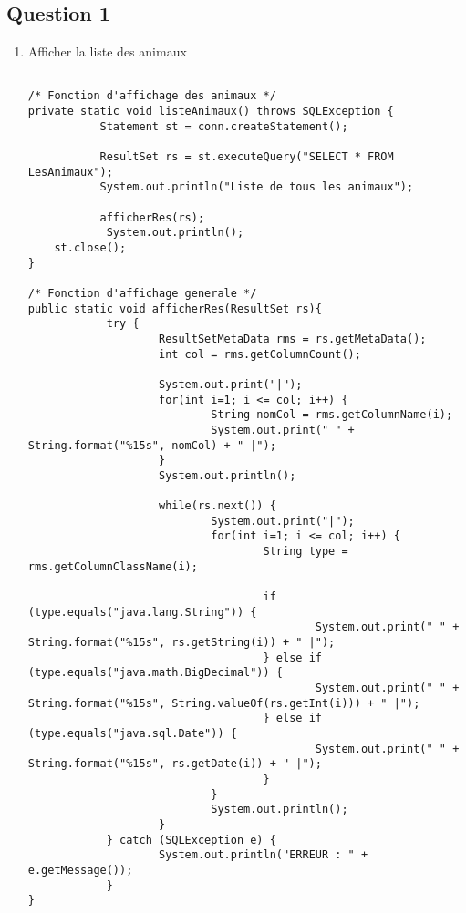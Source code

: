 \documentclass{article}
\begin{document}
\subsection*{Question 1}
\begin{enumerate}[label=\arabic*)]
	\item Afficher la liste des animaux

	\begin{lstlisting}

/* Fonction d'affichage des animaux */
private static void listeAnimaux() throws SQLException {
           Statement st = conn.createStatement();

           ResultSet rs = st.executeQuery("SELECT * FROM LesAnimaux");
           System.out.println("Liste de tous les animaux");

           afficherRes(rs);       
          	System.out.println();
	st.close();
}

/* Fonction d'affichage generale */
public static void afficherRes(ResultSet rs){
            try {
                    ResultSetMetaData rms = rs.getMetaData();
                    int col = rms.getColumnCount();

                    System.out.print("|");
                    for(int i=1; i <= col; i++) {
                            String nomCol = rms.getColumnName(i);
                            System.out.print(" " + String.format("%15s", nomCol) + " |");
                    }
                    System.out.println();

                    while(rs.next()) {
                            System.out.print("|");
                            for(int i=1; i <= col; i++) {
                                    String type = rms.getColumnClassName(i);
                                    
                                    if (type.equals("java.lang.String")) {
                                            System.out.print(" " + String.format("%15s", rs.getString(i)) + " |");
                                    } else if (type.equals("java.math.BigDecimal")) {
                                            System.out.print(" " + String.format("%15s", String.valueOf(rs.getInt(i))) + " |");                                  
                                    } else if (type.equals("java.sql.Date")) {
                                            System.out.print(" " + String.format("%15s", rs.getDate(i)) + " |");
                                    }                             
                            }
                            System.out.println();
                    }
            } catch (SQLException e) {
                    System.out.println("ERREUR : " + e.getMessage());
            }
}	
	\end{lstlisting}


\end{enumerate}
\end{document}
